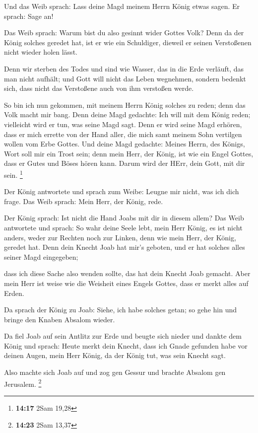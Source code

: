  Und das Weib sprach: Lass deine Magd meinem Herrn König
etwas sagen. Er sprach: Sage an!

 Das Weib sprach: Warum bist du also gesinnt wider Gottes
Volk? Denn da der König solches geredet hat, ist er wie ein Schuldiger,
dieweil er seinen Verstoßenen nicht wieder holen lässt.

 Denn wir sterben des Todes und sind wie Wasser, das in die
Erde verläuft, das man nicht aufhält; und Gott will nicht das Leben
wegnehmen, sondern bedenkt sich, dass nicht das Verstoßene auch von ihm
verstoßen werde.

 So bin ich nun gekommen, mit meinem Herrn König solches zu
reden; denn das Volk macht mir bang. Denn deine Magd gedachte: Ich will
mit dem König reden; vielleicht wird er tun, was seine Magd sagt.
 Denn er wird seine Magd erhören, dass er mich errette von
der Hand aller, die mich samt meinem Sohn vertilgen wollen vom Erbe
Gottes.  Und deine Magd gedachte: Meines Herrn, des Königs,
Wort soll mir ein Trost sein; denn mein Herr, der König, ist wie ein
Engel Gottes, dass er Gutes und Böses hören kann. Darum wird der HErr,
dein Gott, mit dir sein. \footnote{\textbf{14:17} 2Sam 19,28}

 Der König antwortete und sprach zum Weibe: Leugne mir
nicht, was ich dich frage. Das Weib sprach: Mein Herr, der König, rede.

 Der König sprach: Ist nicht die Hand Joabs mit dir in
diesem allem? Das Weib antwortete und sprach: So wahr deine Seele lebt,
mein Herr König, es ist nicht anders, weder zur Rechten noch zur Linken,
denn wie mein Herr, der König, geredet hat. Denn dein Knecht Joab hat
mir's geboten, und er hat solches alles seiner Magd eingegeben;

 dass ich diese Sache also wenden sollte, das hat dein
Knecht Joab gemacht. Aber mein Herr ist weise wie die Weisheit eines
Engels Gottes, dass er merkt alles auf Erden.

 Da sprach der König zu Joab: Siehe, ich habe solches
getan; so gehe hin und bringe den Knaben Absalom wieder.

 Da fiel Joab auf sein Antlitz zur Erde und beugte sich
nieder und dankte dem König und sprach: Heute merkt dein Knecht, dass
ich Gnade gefunden habe vor deinen Augen, mein Herr König, da der König
tut, was sein Knecht sagt.

 Also machte sich Joab auf und zog gen Gessur und brachte
Absalom gen Jerusalem. \footnote{\textbf{14:23} 2Sam 13,37}

